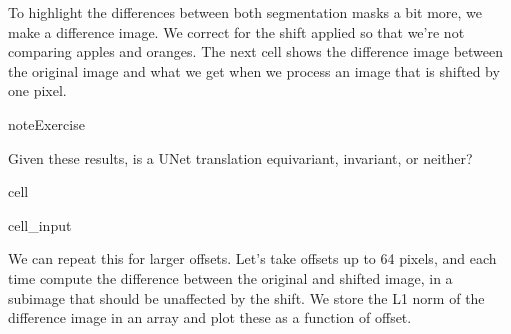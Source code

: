 \documentclass[letterpaper,10pt,english]{jupyterBook}
\begin{document}
\sphinxAtStartPar
To highlight the differences between both segmentation masks a bit more, we make a difference image. We correct for the shift applied so that we’re not comparing apples and oranges. The next cell shows the difference image between the original image and what we get when we process an image that is shifted by one pixel.

\begin{sphinxadmonition}{note}{Exercise}

\sphinxAtStartPar
Given these results, is a U\sphinxhyphen{}Net translation equivariant, invariant, or neither?
\end{sphinxadmonition}

\begin{sphinxuseclass}{cell}\begin{sphinxVerbatimInput}

\begin{sphinxuseclass}{cell_input}
\begin{sphinxVerbatim}[commandchars=\\\{\}]
 
  \PYG{p}{[} \PYG{p}{]}  \PYG{p}{[} \PYG{p}{]}
  \PYG{p}{[} \PYG{p}{]}
\end{sphinxVerbatim}

\end{sphinxuseclass}\end{sphinxVerbatimInput}

\end{sphinxuseclass}
\sphinxAtStartPar
We can repeat this for larger offsets. Let’s take offsets up to 64 pixels, and each time compute the difference between the original and shifted image, in a subimage that should be unaffected by the shift. We store the L1 norm of the difference image in an array  and plot these as a function of offset.
\end{document}
